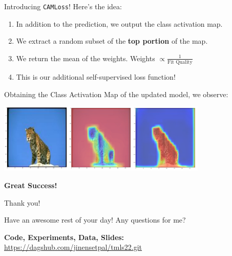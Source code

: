 \documentclass{beamer}
\begin{document}
\begin{frame}{Introducing \texttt{CAMLoss}!}
	Here's the idea:
	\begin{enumerate}[label=\alph*.]
		\item In addition to the prediction, we output the class activation map. \pause
		\item We extract a random subset of the \textbf{top portion} of the map. \pause
		\item We return the mean of the weights. Weights $\propto \frac{1}{\text{Fit Quality}}$ \pause
		\item This is our additional self-supervised loss function! \pause
	\end{enumerate}
	Obtaining the Class Activation Map of the updated model, we observe:
	\begin{center}
		\vspace{-.9em}
		\includegraphics[width=10cm]{img/fixed-cam}
	\end{center} \pause
	\vspace{-1em}
	\textbf{Great Success!}
\end{frame}

\begin{frame}{Thank you!}
	\begin{center}
		Have an awesome rest of your day! Any questions for me?
	\end{center}
	\begin{center}
		\textbf{Code, Experiments, Data, Slides:} \url{https://dagshub.com/jinensetpal/tmls22.git}
	\end{center}
\end{frame}
\end{document}
